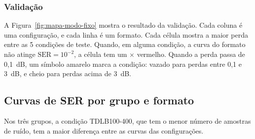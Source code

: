 \subsubsection{Validação}
A Figura~\ref{fig:mapa-modo-fixo} mostra o resultado da validação. Cada coluna é uma configuração, e cada linha é um formato. Cada célula mostra a maior perda entre as 5 condições de teste. Quando, em alguma condição, a curva do formato não atinge $\mathrm{SER} = 10^{-2}$, a célula tem um $\times$ vermelho. Quando a perda passa de 0,1~dB, um símbolo amarelo marca a condição: vazado para perdas entre 0,1 e 3~dB, e cheio para perdas acima de 3~dB.

\subsection{Curvas de SER por grupo e formato}
Nos três grupos, a condição TDLB100-400, que tem o menor número de amostras de ruído, tem a maior diferença entre as curvas das configurações.

